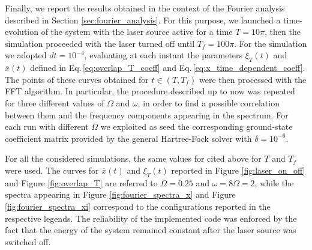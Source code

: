 Finally, we report the results obtained in the context of the Fourier analysis described in Section \ref{sec:fourier_analysis}. For this purpose, we launched a time-evolution of the system with the laser source active for a time $T=10\pi$, then the simulation proceeded with the laser turned off until $T_f = 100\pi$. For the simulation we adopted $dt=10^{-4}$, evaluating at each instant the parameters $\xi_T(t)$ and $\overline{x}(t)$ defined in Eq.\,\ref{eq:overlap_T_coeff} and Eq.\,\ref{eq:x_time_dependent_coeff}. The points of these curves obtained for $t\in (T,T_f)$ were then processed with the FFT algorithm. In particular, the procedure described up to now was repeated for three different values of $\Omega$ and $\omega$, in order to find a possible correlation between them and the frequency components appearing in the spectrum. For each run with different $\Omega$ we exploited as seed the corresponding ground-state coefficient matrix provided by the general Hartree-Fock solver with $\delta=10^{-6}$.

For all the considered simulations, the same values for cited above for $T$ and $T_f$ were used. The curves for $\overline{x}(t)$ and $\xi_T(t)$ reported in Figure \ref{fig:laser_on_off} and Figure \ref{fig:overlap_T} are referred to $\Omega=0.25$ and $\omega=8\Omega=2$, while the spectra appearing in Figure \ref{fig:fourier_spectra_x} and Figure \ref{fig:fourier_spectra_xi} correspond to the configurations reported in the respective legends. The reliability of the implemented code was enforced by the fact that the energy of the system remained constant after the laser source was switched off.

